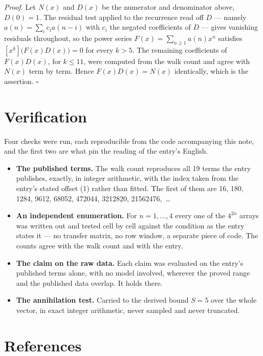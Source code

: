 \documentclass[11pt]{article}
\theoremstyle{definition}
\begin{document}
{\itshape Proof.} Let $N(x)$ and $D(x)$ be the numerator and denominator above, $D(0)=1$. The residual test applied to the recurrence read off $D$ --- namely $a(n) = \sum_i c_i a(n-i)$ with $c_i$ the negated coefficients of $D$ --- gives vanishing residuals throughout, so the power series $F(x)=\sum_{n\ge 1}a(n)x^n$ satisfies $[x^k]\bigl(F(x)D(x)\bigr) = 0$ for every $k > 5$. The remaining coefficients of $F(x)D(x)$, for $k \le 11$, were computed from the walk count and agree with $N(x)$ term by term. Hence $F(x)D(x) = N(x)$ identically, which is the assertion. $\square$

\section{Verification}

Four checks were run, each reproducible from the code accompanying this note, and the first two are what pin the reading of the entry's English.

\begin{itemize}

\item {\bfseries The published terms.} The walk count reproduces all 19 terms the entry publishes, exactly, in integer arithmetic, with the index taken from the entry's stated offset (1) rather than fitted. The first of them are 16, 180, 1284, 9612, 68052, 472044, 3212820, 21562476,~\dots

\item {\bfseries An independent enumeration.} For $n = 1,\dots,4$ every one of the $4^{2n}$ arrays was written out and tested cell by cell against the condition as the entry states it --- no transfer matrix, no row window, a separate piece of code. The counts agree with the walk count and with the entry.

\item {\bfseries The claim on the raw data.} Each claim was evaluated on the entry's published terms alone, with no model involved, wherever the proved range and the published data overlap. It holds there.

\item {\bfseries The annihilation test.} Carried to the derived bound $S = 5$ over the whole vector, in exact integer arithmetic, never sampled and never truncated.

\end{itemize}

\section{References}
\end{document}
